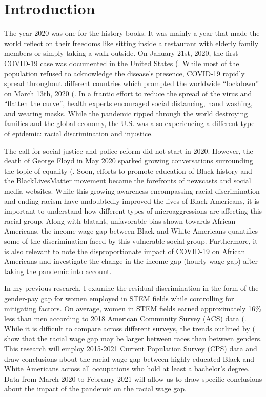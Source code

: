 \documentclass[12pt, english]{article}
\begin{document}
\section{Introduction}

The year 2020 was one for the history books. It was mainly a year that made the world reflect on their freedoms like sitting inside a restaurant with elderly family members or simply taking a walk outside. On January 21st, 2020, the first COVID-19 case was documented in the United States (\citet{Hist2021}. While most of the population refused to acknowledge the disease’s presence, COVID-19 rapidly spread throughout different countries which prompted the worldwide “lockdown” on March 13th, 2020 (\citet{Hist2021}. In a frantic effort to reduce the spread of the virus and “flatten the curve”, health experts encouraged social distancing, hand washing, and wearing masks. While the pandemic ripped through the world destroying families and the global economy, the U.S. was also experiencing a different type of epidemic: racial discrimination and injustice. 

The call for social justice and police reform did not start in 2020. However, the death of George Floyd in May 2020 sparked growing conversations surrounding the topic of equality (\citet{DAMORE2020}. Soon, efforts to promote education of Black history and the BlackLivesMatter movement became the forefronts of newscasts and social media websites. While this growing awareness encompassing racial discrimination and ending racism have undoubtedly improved the lives of Black Americans, it is important to understand how different types of microaggressions are affecting this racial group. Along with blatant, unfavorable bias shown towards African Americans, the income wage gap between Black and White Americans quantifies some of the discrimination faced by this vulnerable social group. Furthermore, it is also relevant to note the disproportionate impact of COVID-19 on African Americans and investigate the change in the income gap (hourly wage gap) after taking the pandemic into account. 

In my previous research, I examine the residual discrimination in the form of the gender-pay gap for women employed in STEM fields while controlling for mitigating factors. On average, women in STEM fields earned approximately 16\% less than men according to 2018 American Community Survey (ACS) data (\citet{REINSCH2020}. While it is difficult to compare across different surveys, the trends outlined by (\citet{McCall2001} show that the racial wage gap may be larger between races than between genders. This research will employ 2015-2021 Current Population Survey (CPS) data and draw conclusions about the racial wage gap between highly educated Black and White Americans across all occupations who hold at least a bachelor’s degree. Data from March 2020 to February 2021 will allow us to draw specific conclusions about the impact of the pandemic on the racial wage gap.
\end{document}
